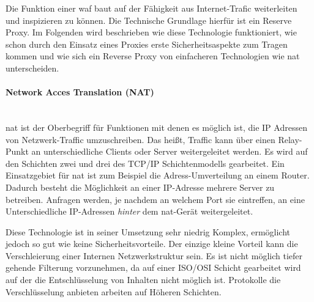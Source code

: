 % 
% 
% 
Die Funktion einer \ac{waf} baut auf der Fähigkeit aus Internet-Trafic weiterleiten und inspizieren zu können.
Die Technische Grundlage hierfür ist ein Reserve Proxy.
Im Folgenden wird beschrieben wie diese Technologie funktioniert, wie schon durch den Einsatz eines Proxies erste Sicherheitsaspekte zum Tragen kommen und wie sich ein Reverse Proxy von einfacheren Technologien wie \ac{nat} unterscheiden.

\paragraph{Network Acces Translation (NAT)}\ \\
\ac{nat} ist der Oberbegriff für Funktionen mit denen es möglich ist, die IP Adressen von Netzwerk-Traffic umzuschreiben.
Das heißt, Traffic kann über einen Relay-Punkt an unterschiedliche Clients oder Server weitergeleitet werden.
Es wird auf den Schichten zwei und drei des TCP/IP Schichtenmodells gearbeitet.
Ein Einsatzgebiet für \ac{nat} ist zum Beispiel die Adress-Umverteilung an einem Router.
Dadurch besteht die Möglichkeit an einer IP-Adresse mehrere Server zu betreiben.
Anfragen werden, je nachdem an welchem Port sie eintreffen, an eine Unterschiedliche IP-Adressen \textit{hinter} dem \ac{nat}-Gerät weitergeleitet.

Diese Technologie ist in seiner Umsetzung sehr niedrig Komplex, ermöglicht jedoch so gut wie keine Sicherheitsvorteile.
Der einzige kleine Vorteil kann die Verschleierung einer Internen Netzwerkstruktur sein.
Es ist nicht möglich tiefer gehende Filterung vorzunehmen, da auf einer ISO/OSI Schicht gearbeitet wird auf der die Entschlüsselung von Inhalten nicht möglich ist.
Protokolle die Verschlüsselung anbieten arbeiten auf Höheren Schichten.

